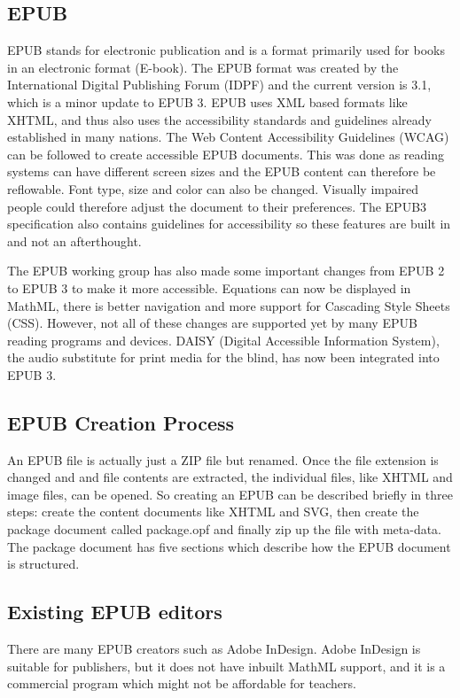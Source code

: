 \documentclass{llncs}
\begin{document}
\subsection{EPUB}
EPUB stands for electronic publication and is a format primarily used for books in an electronic format (E-book). The EPUB format was created by the International Digital Publishing Forum (IDPF) and the current version is 3.1, which is a minor update to EPUB 3.\cite{EPUBspecs} EPUB uses XML based formats like XHTML, and thus also uses the accessibility standards and guidelines already established in many nations. The Web Content Accessibility Guidelines (WCAG) can be followed to create accessible EPUB documents.\cite{WCAG} This was done as reading systems can have different screen sizes and the EPUB content can therefore be reflowable. Font type, size and color can also be changed. Visually impaired people could therefore adjust the document to their preferences. The EPUB3 specification also contains guidelines for accessibility so these features are built in and not an afterthought.\cite{EPUB3bp}

The EPUB working group has also made some important changes from EPUB 2 to EPUB 3  to make it more accessible. Equations can now be displayed in MathML, there is better navigation and more support for Cascading Style Sheets (CSS). However, not all of these changes are supported yet by many EPUB reading programs and devices.\cite{EPUB30changes} DAISY (Digital Accessible Information System), the audio substitute for print media for the blind, has now been integrated into EPUB 3.\cite{daisyAccessibility}

\subsection{EPUB Creation Process}
An EPUB file is actually just a ZIP file but renamed.\cite{WhatIsEpub3} Once the file extension is changed and and file contents are extracted, the individual files, like XHTML and image files, can be opened. So creating an EPUB can be described briefly in three steps: create the content documents like XHTML and SVG, then create the package document  called package.opf and finally zip up the file with meta-data.
The package document has five sections which describe how the EPUB document is structured.\cite{EPUB3bp}

\subsection{Existing EPUB editors}
There are many EPUB creators such as Adobe InDesign. Adobe InDesign is suitable for publishers, but it does not have inbuilt MathML support, and it is a commercial program which might not be affordable for teachers.
\end{document}
